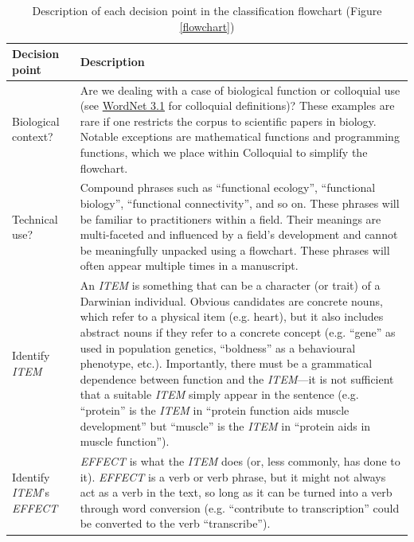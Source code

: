 \documentclass{article}
\begin{document}
\begin{landscape}
  \begin{table}
    \caption{Description of each decision point in the classification flowchart (Figure \ref{flowchart})}
  \begin{tabular}{|p{0.17\linewidth}|p{0.97\linewidth}|}
    \hline
    Decision point & Description \\
    \hline
    Biological context? & Are we dealing with a case of biological function or colloquial use (see \href{http://wordnetweb.princeton.edu/perl/webwn?s=function&sub=Search+WordNet&o2=&o0=1&o8=1&o1=1&o7=&o5=&o9=&o6=&o3=&o4=&h=}{WordNet 3.1} for colloquial definitions)? These examples are rare if one restricts the corpus to scientific papers in biology. Notable exceptions are mathematical functions and programming functions, which we place within Colloquial to simplify the flowchart. \\
    \hline
    Technical use? & Compound phrases such as ``functional ecology'', ``functional biology'', ``functional connectivity'', and so on. These phrases will be familiar to practitioners within a field. Their meanings are multi-faceted and influenced by a field's development and cannot be meaningfully unpacked using a flowchart.  These phrases will often appear multiple times in a manuscript. \\
    \hline
    Identify \emph{ITEM} &  An \emph{ITEM} is something that can be a character (or trait) of a Darwinian individual. Obvious candidates are concrete nouns, which refer to a physical item (e.g. heart), but it also includes abstract nouns if they refer to a concrete concept (e.g. ``gene'' as used in population genetics, ``boldness'' as a behavioural phenotype, etc.). Importantly, there must be a grammatical dependence between function and the \emph{ITEM}---it is not sufficient that a suitable \emph{ITEM} simply appear in the sentence (e.g. ``protein'' is the \emph{ITEM} in  ``protein function aids muscle development'' but ``muscle'' is the \emph{ITEM} in ``protein aids in muscle function''). \\
    \hline
    Identify \emph{ITEM}'s \emph{EFFECT} & \emph{EFFECT} is what the \emph{ITEM} does (or, less commonly, has done to it). \emph{EFFECT} is a verb or verb phrase, but it might not always act as a verb in the text, so long as it can be turned into a verb through word conversion (e.g. ``contribute to transcription'' could be converted to the verb ``transcribe''). \\

\end{tabular}
\end{table}
\end{landscape}
\end{document}
